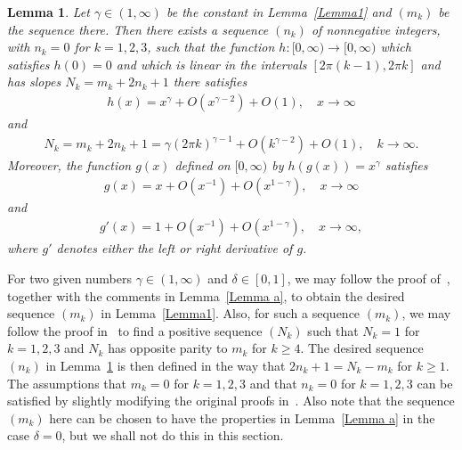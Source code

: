 \documentclass[12pt]{amsart}
\numberwithin{equation}{section}
\newtheorem{lemma}[theorem]{Lemma}
\begin{document}
\begin{lemma}\label{Lemma2}
Let $\gamma\in(1,\infty)$ be the constant in Lemma~\ref{Lemma1} and $(m_k)$ be the sequence there. Then there exists a sequence $(n_k)$ of nonnegative integers, with $n_k=0$ for $k=1,2,3$, such that the function $h:[0,\infty)\to[0,\infty)$ which satisfies $h(0)=0$ and which is linear in the intervals $[2\pi (k-1), 2\pi k]$ and has slopes $N_k=m_k+2n_k+1$ there satisfies
\begin{equation*}%
\begin{split}
h(x)=x^{\gamma}+O(x^{\gamma-2})+O(1), \quad x\to\infty
\end{split}
\end{equation*}
and
\begin{equation}\label{recuree1pm16  fajr-2}
\begin{split}
N_k=m_k+2n_k+1=\gamma(2\pi k)^{\gamma-1}+O\left(k^{\gamma-2}\right)+O(1), \quad k\to\infty.
\end{split}
\end{equation}
Moreover, the function $g(x)$ defined on $[0,\infty)$ by $h(g(x))=x^{\gamma}$ satisfies
\begin{equation}\label{recuree1pm17  fajr-1}
\begin{split}
g(x)=x+O(x^{-1})+O(x^{1-\gamma}), \quad x\to\infty
\end{split}
\end{equation}
and
\begin{equation}\label{recuree1pm18   fajr0}
\begin{split}
g'(x)=1+O(x^{-1})+O(x^{1-\gamma}), \quad x\to\infty,
\end{split}
\end{equation}
where $g'$ denotes either the left or right derivative of $g$.

\end{lemma}

For two given numbers $\gamma\in(1,\infty)$ and $\delta\in[0,1]$, we may follow the proof
of~\cite[Lemma~2.2]{Zhang2024}, together with the comments in Lemma~\ref{Lemma a}, to obtain the desired sequence $(m_k)$ in Lemma~\ref{Lemma1}. Also, for such a sequence $(m_k)$, we may follow the proof in~\cite[Lemma~2.1]{Zhang2024} to find a positive sequence $(N_k)$ such that $N_k=1$ for $k=1,2,3$ and $N_k$ has opposite parity to $m_k$ for $k\geq 4$. The desired sequence $(n_k)$ in Lemma~\ref{Lemma2} is then defined in the way that $2n_k+1=N_k-m_k$ for $k\geq 1$. The assumptions that $m_k=0$ for $k=1,2,3$ and that $n_k=0$ for $k=1,2,3$ can be satisfied by slightly modifying the original proofs in~\cite{Zhang2024}. Also note that the sequence $(m_k)$ here can be chosen to have the properties in Lemma~\ref{Lemma a} in the case $\delta=0$, but we shall not do this in this section.
\end{document}
